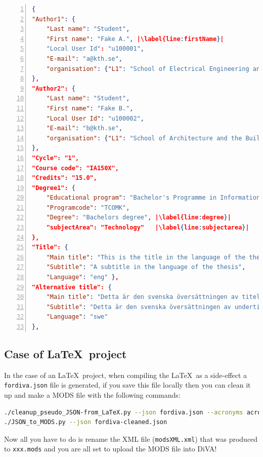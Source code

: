 \begin{lstlisting}[language=json, numbers=left,
    stepnumber=1, escapechar=|, caption={Text version of the top of the For DIVA output (reformatted to bring out the structure and improve readability - line numbers are added just in the listing)}, label=lst:forDIVAtop]
{
"Author1": { 
    "Last name": "Student",
    "First name": "Fake A.", |\label{line:firstName}|
    "Local User Id": "u100001",
    "E-mail": "a@kth.se",
    "organisation": {"L1": "School of Electrical Engineering and Computer Science",}
},
"Author2": {
    "Last name": "Student",
    "First name": "Fake B.",
    "Local User Id": "u100002",
    "E-mail": "b@kth.se",
    "organisation": {"L1": "School of Architecture and the Built Environment",}
},
"Cycle": "1",
"Course code": "IA150X",
"Credits": "15.0",
"Degree1": {
    "Educational program": "Bachelor's Programme in Information and Communication Technology",
    "Programcode": "TCOMK",
    "Degree": "Bachelors degree", |\label{line:degree}|
    "subjectArea": "Technology"   |\label{line:subjectarea}|
},
"Title": {
    "Main title": "This is the title in the language of the thesis",
    "Subtitle": "A subtitle in the language of the thesis",
    "Language": "eng" },
"Alternative title": {
    "Main title": "Detta är den svenska översättningen av titeln",
    "Subtitle": "Detta är den svenska översättningen av undertiteln",
    "Language": "swe"
},
\end{lstlisting}

\subsection{Case of \LaTeX~project}
\label{sec:extractingJSONLaTeX}

In the case of an \LaTeX~project, when compiling the \LaTeX~as a side-effect a \texttt{fordiva.json} file is generated, if you save this file locally then you can clean it up and make a MODS file with the following commands:
\begin{lstlisting}[basicstyle=\footnotesize, language={bash}, caption={Cleanup pseudo JSON produced by the \LaTeX~compiler and then make a MODS file},label=lst:AdmincleanPseudoJSONandConvertToMODS]
./cleanup_pseudo_JSON-from_LaTeX.py --json fordiva.json --acronyms acronyms.tex
./JSON_to_MODS.py --json fordiva-cleaned.json
\end{lstlisting}

Now all you have to do is rename the XML file (\texttt{modsXML.xml}) that was produced to \texttt{xxx.mods} and you are all set to upload the MODS file into DiVA!

